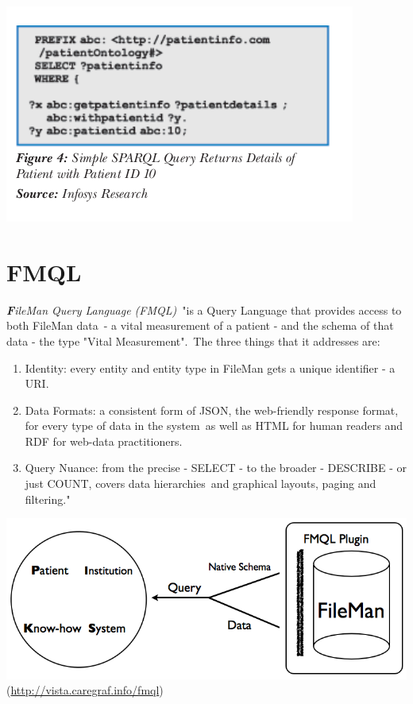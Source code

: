 \documentclass[DIV=calc, paper=a4, fontsize=12pt, onecolumn]{scrartcl}	 %
\newcommand{\initial}[1]{ %
\lettrine[lines=3,lhang=0.3,nindent=0em,slope=0em]{
\color{DarkBlue}
{\textbf{\textit{#1}}}}{}}
\begin{document}
		  \includegraphics[scale=0.5]{sparqlh.png}
 		  \cite{parachuri2008role}
 		

		


\section[FileMan Query Language (FMQL)]{FMQL}
  \label{sec:fmql}

\initial{F}\textit{ileMan Query Language (FMQL)}\
"is a Query Language that provides access to both FileMan data\
- a vital measurement of a patient - and the schema of that data - the type "Vital Measurement".\
The three things that it addresses are:
\begin{enumerate}
\item
Identity: every entity and entity type in FileMan gets a unique identifier - a URI.
\item
Data Formats: a consistent form of JSON, the web-friendly response format, for every type of data in the system\
 as well as HTML for human readers and RDF for web-data practitioners.
\item
Query Nuance: from the precise - SELECT - to the broader - DESCRIBE - or just COUNT, covers data hierarchies\
 and graphical layouts, paging and filtering."
\end{enumerate}
\includegraphics[scale=0.4]{fmqlFromFileMan.png}\\
(\url{http://vista.caregraf.info/fmql})\
\end{document}
